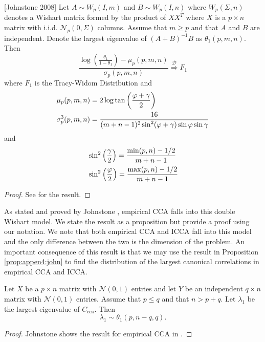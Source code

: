 \begin{prop}\label{prop:appen4:john}[Johnstone 2008]
  Let $A\sim W_p(I,m)$ and $B\sim W_p(I,n)$ where $W_p(\Sigma,n)$ denotes a Wishart
   matrix formed by the product of $XX^T$ where $X$ is a $p\times n$ matrix
  with i.i.d. $\mathcal{N}_p(0,\Sigma)$ columns. Assume that $m\geq p$ and that $A$ and
  $B$ are independent. Denote the largest
  eigenvalue of $(A+B)^{-1}B$ as $\theta_1(p,m,n)$. Then 
  \begin{equation}
    \frac{\log\left(\frac{\theta_1}{1-\theta_1}\right)
      -\mu_p(p,m,n)}{\sigma_p(p,m,n)}\overset{\mathcal{D}}{\Rightarrow} F_1
  \end{equation}
  where $F_1$ is the Tracy-Widom Distribution and
  \begin{equation}\label{eq:mu_sigma}
    \ba
    & \mu_p(p,m,n) = 2\log\tan\left(\frac{\varphi + \gamma}{2}\right)\\
    & \sigma^3_p(p,m,n) = \frac{16}{(m+n-1)^2\sin^2(\varphi+\gamma)\sin\varphi\sin\gamma}
    \ea
  \end{equation}
  and
  \begin{equation}
    \begin{aligned}
    & \sin^2\left(\frac{\gamma}{2}\right) = \frac{\min(p,n)-1/2}{m+n-1}\\
    & \sin^2\left(\frac{\varphi}{2}\right) = \frac{\max(p,n)-1/2}{m+n-1}\\
    \end{aligned}
  \end{equation}
\end{prop}
\begin{proof}
See  \cite{johnstone2008multivariate} for the result.
\end{proof}

As stated and proved by Johnstone \cite{johnstone2008multivariate}, empirical CCA falls
into this double Wishart model. We state the result as a proposition but provide a proof
using our notation. We note that both empirical CCA and ICCA fall into this model and the
only difference between the two is the dimension of the problem. An important consequence
of this result is that we may use the result in Proposition \ref{prop:appen4:john} to find
the distribution of the largest canonical correlations in empirical CCA and ICCA.

\begin{prop}\label{th:icca_sig_real}
  Let $X$ be a $p\times n$ matrix with $\mathcal{N}(0,1)$ entries and let $Y$ be an
  independent $q\times n$ matrix with $\mathcal{N}(0,1)$ entries. Assume that $p\leq
  q$ and that $n>p+q$. Let $\lambda_1$ be the largest eigenvalue of $C_{\text{cca}}$.  Then
  \begin{equation}
    \lambda_1\sim \theta_1(p,n-q,q).
  \end{equation}
\end{prop}
\begin{proof}
  Johnstone shows the result for empirical CCA in \cite{johnstone2008multivariate}. 
\end{proof}

